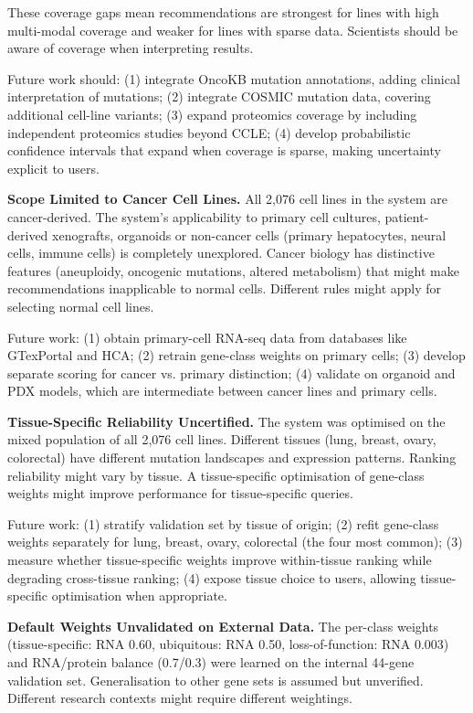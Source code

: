 \documentclass[author={Karen Coutinho, Ishaan Bhalla, Aman Raj, Dixit Kaloorani Malarmannan},
                supervisor={Dr. Daniel D'Andrea},
                degree={MSc},
                title={CellSelector Omics: A Multi-Omics Recommendation System for Cell Line Selection},
                subtitle={},
                type={},
                year={2026}]{dissertation}
\begin{document}
These coverage gaps mean recommendations are strongest for lines with high multi-modal 
coverage and weaker for lines with sparse data. Scientists should be aware of coverage 
when interpreting results.


Future work should: (1) integrate OncoKB mutation annotations, adding clinical interpretation of mutations; (2) integrate COSMIC mutation data, covering additional cell-line variants; (3) expand proteomics coverage by including independent proteomics studies beyond CCLE; (4) develop probabilistic confidence intervals that expand when coverage is sparse, making uncertainty explicit to users.

{\bf Scope Limited to Cancer Cell Lines.} All 2,076 cell lines in the system are cancer-derived. The system's applicability to primary cell cultures, patient-derived xenografts, organoids or non-cancer cells (primary hepatocytes, neural cells, immune cells) is completely unexplored. Cancer biology has distinctive features (aneuploidy, oncogenic mutations, altered metabolism) that might make recommendations inapplicable to normal cells. Different rules might apply for selecting normal cell lines.

Future work: (1) obtain primary-cell RNA-seq data from databases like GTexPortal and HCA; (2) retrain gene-class weights on primary cells; (3) develop separate scoring for cancer vs. primary distinction; (4) validate on organoid and PDX models, which are intermediate between cancer lines and primary cells.

{\bf Tissue-Specific Reliability Uncertified.} The system was optimised on the mixed population of all 2,076 cell lines. Different tissues (lung, breast, ovary, colorectal) have different mutation landscapes and expression patterns. Ranking reliability might vary by tissue. A tissue-specific optimisation of gene-class weights might improve performance for tissue-specific queries.

Future work: (1) stratify validation set by tissue of origin; (2) refit gene-class weights separately for lung, breast, ovary, colorectal (the four most common); (3) measure whether tissue-specific weights improve within-tissue ranking while degrading cross-tissue ranking; (4) expose tissue choice to users, allowing tissue-specific optimisation when appropriate.

{\bf Default Weights Unvalidated on External Data.} The per-class weights (tissue-specific: RNA 0.60, ubiquitous: RNA 0.50, loss-of-function: RNA 0.003) and RNA/protein balance (0.7/0.3) were learned on the internal 44-gene validation set. Generalisation to other gene sets is assumed but unverified. Different research contexts might require different weightings.
\end{document}
